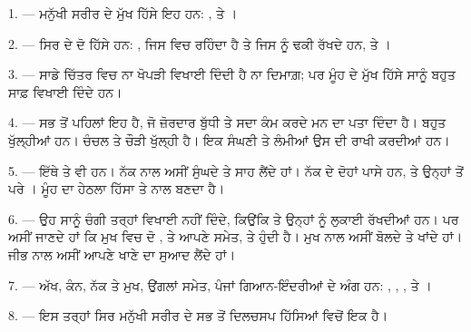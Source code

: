 
\VUsaut{4.0mm}
\VUsaut{2.0mm}

\VUsaut{2.4mm}
\VUsaut{3.0mm}

1. --- ਮਨੁੱਖੀ ਸਰੀਰ ਦੇ ਮੁੱਖ ਹਿੱਸੇ ਇਹ ਹਨ: ,  ਤੇ
।

\VUsaut{3.0mm}

2. --- ਸਿਰ ਦੇ ਦੋ ਹਿੱਸੇ ਹਨ: , ਜਿਸ ਵਿਚ  ਰਹਿੰਦਾ ਹੈ
ਤੇ ਜਿਸ ਨੂੰ  ਢਕੀ ਰੱਖਦੇ ਹਨ, ਤੇ ।

3. --- ਸਾਡੇ ਚਿੱਤਰ ਵਿਚ ਨਾ ਖੋਪੜੀ ਵਿਖਾਈ ਦਿੰਦੀ ਹੈ ਨਾ ਦਿਮਾਗ਼; ਪਰ ਮੂੰਹ ਦੇ ਮੁੱਖ ਹਿੱਸੇ
ਸਾਨੂੰ ਬਹੁਤ ਸਾਫ਼ ਵਿਖਾਈ ਦਿੰਦੇ ਹਨ।

4. --- ਸਭ ਤੋਂ ਪਹਿਲਾਂ ਇਹ  ਹੈ, ਜੋ ਜ਼ੋਰਦਾਰ ਬੁੱਧੀ ਤੇ ਸਦਾ ਕੰਮ ਕਰਦੇ ਮਨ
ਦਾ ਪਤਾ ਦਿੰਦਾ ਹੈ।  ਬਹੁਤ ਖੁੱਲ੍ਹੀਆਂ ਹਨ।  ਚੰਚਲ ਤੇ
ਚੌੜੀ ਖੁੱਲ੍ਹੀ ਹੈ। ਇਕ ਸੰਘਣੀ  ਤੇ ਲੰਮੀਆਂ  ਉਸ ਦੀ
ਰਾਖੀ ਕਰਦੀਆਂ ਹਨ।

5. --- ਇੱਥੇ  ਤੇ  ਵੀ ਹਨ। ਨੱਕ ਨਾਲ ਅਸੀਂ ਸੁੰਘਦੇ ਤੇ ਸਾਹ
ਲੈਂਦੇ ਹਾਂ। ਨੱਕ ਦੇ ਦੋਹਾਂ ਪਾਸੇ  ਹਨ, ਤੇ ਉਨ੍ਹਾਂ ਤੋਂ ਪਰੇ
। ਮੂੰਹ ਦਾ ਹੇਠਲਾ ਹਿੱਸਾ  ਤੇ  ਨਾਲ ਬਣਦਾ ਹੈ।

6. --- ਉਹ ਸਾਨੂੰ ਚੰਗੀ ਤਰ੍ਹਾਂ ਵਿਖਾਈ ਨਹੀਂ ਦਿੰਦੇ, ਕਿਉਂਕਿ  ਤੇ
 ਉਨ੍ਹਾਂ ਨੂੰ ਲੁਕਾਈ ਰੱਖਦੀਆਂ ਹਨ। ਪਰ ਅਸੀਂ ਜਾਣਦੇ ਹਾਂ ਕਿ ਮੁਖ ਵਿਚ ਦੋ
,  ਤੇ  ਆਪਣੇ
 ਸਮੇਤ, ਤੇ  ਹੁੰਦੀ ਹੈ। ਮੁਖ ਨਾਲ ਅਸੀਂ ਬੋਲਦੇ ਤੇ ਖਾਂਦੇ
ਹਾਂ। ਜੀਭ ਨਾਲ ਅਸੀਂ ਆਪਣੇ ਖਾਣੇ ਦਾ ਸੁਆਦ ਲੈਂਦੇ ਹਾਂ।

7. --- ਅੱਖ, ਕੰਨ, ਨੱਕ ਤੇ ਮੁਖ, ਉਂਗਲਾਂ ਸਮੇਤ, ਪੰਜਾਂ ਗਿਆਨ-ਇੰਦਰੀਆਂ ਦੇ ਅੰਗ ਹਨ:
, , ,  ਤੇ
।

8. --- ਇਸ ਤਰ੍ਹਾਂ ਸਿਰ ਮਨੁੱਖੀ ਸਰੀਰ ਦੇ ਸਭ ਤੋਂ ਦਿਲਚਸਪ ਹਿੱਸਿਆਂ ਵਿਚੋਂ ਇਕ ਹੈ।

